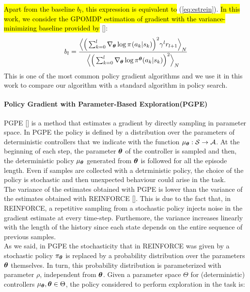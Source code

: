 \hl{Apart from the baseline $b_l$, this expression is equivalent to} (\ref{eq:estrein}). 
\hl{In this work, we consider the GPOMDP estimation of gradient with the variance-minimizing baseline provided by} [\cite{Peters2008ReinforcementLO}]:
\begin{align} b_l = \frac{\Big\langle\Big( \sum_{k=0}^{l}\nabla_{\boldsymbol{\theta}} \log\pi^{}(a_k|s_k)\Big)^2 \gamma^{l}r_{l+1}\Big\rangle_{N}} {\Big\langle\Big( \sum_{k=0}^{l}\nabla_{\boldsymbol{\theta}} \log\pi^{\boldsymbol{\theta}}(a_k|s_k)\Big)^2\Big\rangle_{N}}
\end{align} 
This is one of the most common policy gradient algorithms and we use it in this work to compare our algorithm with a standard algorithm in policy search.

\paragraph{Policy Gradient with Parameter-Based Exploration(PGPE)} \label{subsec:pgpe}
\ac{PGPE} [\cite{sehnke2008PolicyGradient}] is a method that estimates a gradient by directly sampling in parameter space. In \ac{PGPE} the policy is defined by a distribution over the parameters of deterministic controllers that we indicate with the function $\mu_{\boldsymbol{\theta}}: \mathcal{S} \to \mathcal{A}$. At the beginning of each step, the parameter $\boldsymbol{\theta}$ of the controller is sampled and then, the deterministic policy $\mu_{\boldsymbol{\theta}}$ generated from $\boldsymbol{\theta}$ is followed for all the episode length. Even if samples are collected with a detrministic policy, the choice of the policy is stochastic and then unexpected behaviour could arise in the task.\\
\newline
The variance of the estimates obtained with \ac{PGPE} is lower than the variance of the estimates obtained with REINFORCE [\cite{zhao2013efficient}]. This is due to the fact that, in REINFORCE, a repetitive sampling from a stochastic policy injects noise in the gradient estimate at every time-step. Furthemore, the variance increases linearly with the length of the history since each state depends on the entire sequence of previous samples.\\
\newline
As we said, in \ac{PGPE} the stochasticity that in REINFORCE was given by a stochastic policy $\pi_{\boldsymbol{\theta}}$ is replaced by a probability distribution over the parameters $\boldsymbol{\theta}$ themselves. In turn, this probability distribution is parameterized with parameter $\rho$, independent from $\boldsymbol{\theta}$. Given a parameter space $\Theta$ for (deterministic) controllers $\mu_{\boldsymbol{\theta}}, \boldsymbol{\theta} \in \Theta$, the policy considered to perform exploration in the task is:

